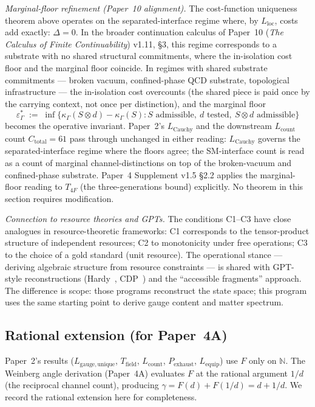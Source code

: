 \documentclass[11pt]{article}
\theoremstyle{definition}
\begin{document}
\noindent\textit{Marginal-floor refinement (Paper~10 alignment).}\quad
The cost-function uniqueness theorem above operates on the separated-interface regime where, by $L_{\mathrm{loc}}$, costs add exactly: $\Delta = 0$.  In the broader continuation calculus of Paper~10 (\emph{The Calculus of Finite Continuability}) v1.11, \S3, this regime corresponds to a substrate with no shared structural commitments, where the in-isolation cost floor and the marginal floor coincide.  In regimes with shared substrate commitments --- broken vacuum, confined-phase QCD substrate, topological infrastructure --- the in-isolation cost overcounts (the shared piece is paid once by the carrying context, not once per distinction), and the marginal floor
\[
        \varepsilon^*_\Gamma \;:=\; \inf\bigl\{\kappa_\Gamma(S \otimes d) - \kappa_\Gamma(S) : S \text{ admissible},\ d \text{ tested},\ S\otimes d \text{ admissible}\bigr\}
\]
becomes the operative invariant.  Paper~2's $L_{\mathrm{Cauchy}}$ and the downstream $L_{\mathrm{count}}$ count $C_{\mathrm{total}} = 61$ pass through unchanged in either reading: $L_{\mathrm{Cauchy}}$ governs the separated-interface regime where the floors agree; the SM-interface count is read as a count of marginal channel-distinctions on top of the broken-vacuum and confined-phase substrate.  Paper~4 Supplement v1.5 \S2.2 applies the marginal-floor reading to $T_{4F}$ (the three-generations bound) explicitly.  No theorem in this section requires modification.

\noindent\textit{Connection to resource theories and GPTs.}\quad
The conditions C1--C3 have close analogues in resource-theoretic
frameworks: C1 corresponds to the tensor-product structure of
independent resources; C2 to monotonicity under free operations; C3
to the choice of a gold standard (unit resource).  The operational
stance --- deriving algebraic structure from resource constraints ---
is shared with GPT-style reconstructions (Hardy~\cite{Hardy2001},
CDP~\cite{CDP2011}) and the ``accessible fragments'' approach.  The
difference is scope: those programs reconstruct the state space; this
program uses the same starting point to derive gauge content and
matter spectrum.


\subsection{Rational extension (for Paper~4A)}
\label{sec:cauchy_rational}

Paper~2's results ($L_{\mathrm{gauge,unique}}$, $T_{\mathrm{field}}$,
$L_{\mathrm{count}}$, $P_{\mathrm{exhaust}}$, $L_{\mathrm{equip}}$) use
$F$ only on $\mathbb{N}$.  The Weinberg angle derivation (Paper~4A)
evaluates $F$ at the rational argument $1/d$ (the reciprocal channel
count), producing $\gamma = F(d) + F(1/d) = d + 1/d$.  We record the
rational extension here for completeness.
\end{document}
